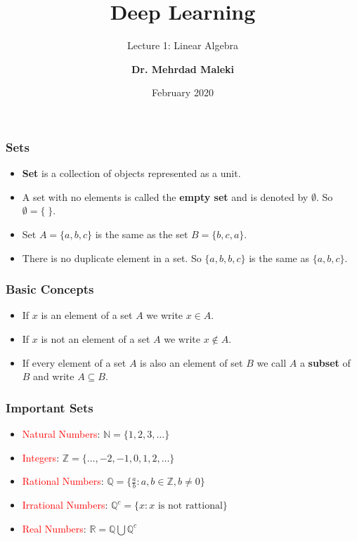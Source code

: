 \documentclass[12pt,aspectratio=169]{beamer}
\title[Finite Automata] %
{Deep Learning}
\subtitle{Lecture 1: Linear Algebra}
\date{February 2020}
\author[]{\textbf{Dr. Mehrdad Maleki}}
\date{}
\begin{document}
 
\frame{\titlepage}

\newcommand{\SYSTEM}[2]{\raisebox{-1ex}{\shortstack{#1\\[-0.25ex]\tiny #2}}}
\newcommand{\YES}{\textcolor{dkgreen}{$\ballotcheck$}}
\newcommand{\NOPE}{\textcolor{dkred}{$\ballotx$}}
\newcommand{\MAYBE}{\textcolor{dkblue}{\textbf{?}}}




\begin{frame}
\frametitle{Sets}
\begin{itemize}
\item \textbf{Set} is a collection of objects represented as a unit.
\bigskip \pause
\item A set with no elements is called the \textbf{empty set} and is denoted by $\emptyset$. So $\emptyset=\{\;\}$.\pause
\item Set $A=\{a,b,c\}$ is the same as the set $B=\{b,c,a\}$.
\bigskip \pause
\item There is no duplicate element in a set. So $\{a,b,b,c\}$ is the same as $\{a,b,c\}$.
\end{itemize}
\end{frame}

\begin{frame}
\frametitle{Basic Concepts}
\begin{itemize}
\item If $x$ is an element of a set $A$ we write $x\in A$.
\bigskip \pause
\item If $x$ is not an element of a set $A$ we write $x\notin A$.
\bigskip \pause
\item If every element of a set $A$ is also an element of set $B$ we call $A$ a \textbf{subset} of $B$ and write $A\subseteq B$.
\end{itemize}
\end{frame}

\begin{frame}
\frametitle{Important Sets}
\begin{itemize}
\item \textcolor{red}{Natural Numbers}: $\mathbb{N}=\{1,2,3,\dots\}$
\bigskip \pause
\item \textcolor{red}{Integers}: $\mathbb{Z}=\{\dots,-2,-1,0,1,2,\dots\}$
\bigskip \pause
\item \textcolor{red}{Rational Numbers}: $\mathbb{Q}=\{\frac{a}{b}:a,b\in \mathbb{Z},b\neq 0\}$
\bigskip \pause
\item \textcolor{red}{Irrational Numbers}: $\mathbb{Q}^c=\{x:x \text{ is not rattional}\}$
\bigskip \pause
\item \textcolor{red}{Real Numbers}: $\mathbb{R}=\mathbb{Q}\bigcup \mathbb{Q}^c$

\end{itemize}
\end{frame}
\end{document}
